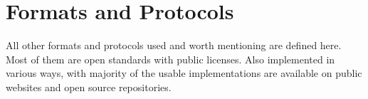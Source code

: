 \chapter{Formats and Protocols}
\label{apx:formats-protocols}

All other formats and protocols used and worth mentioning are defined here. Most of them are open standards with public licenses. Also implemented in various ways, with majority of the usable implementations are available on public websites and open source repositories.

